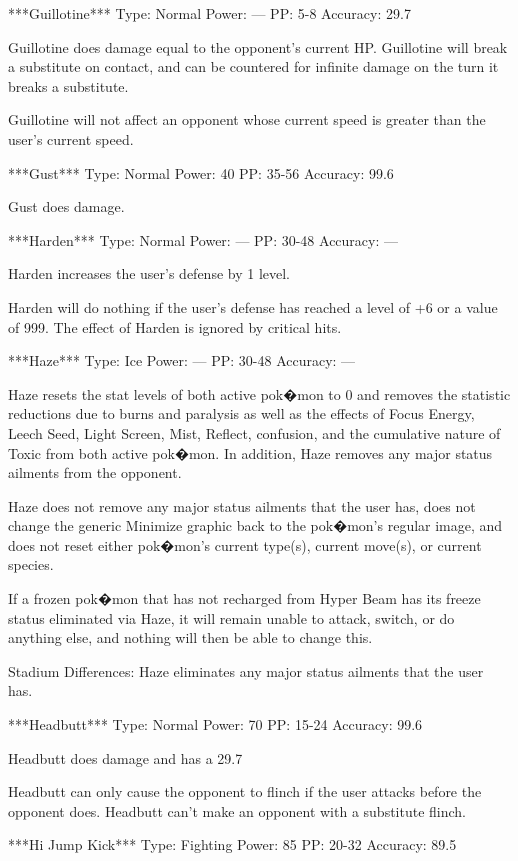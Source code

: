 \documentclass[reprint, aps, prl, paper=A4]{revtex4-1}
\begin{document}
***Guillotine***
Type: Normal
Power: ---
PP: 5-8
Accuracy: 29.7%

Guillotine does damage equal to the opponent's current HP. Guillotine will break a substitute
on contact, and can be countered for infinite damage on the turn it breaks a substitute.

Guillotine will not affect an opponent whose current speed is greater than the user's current
speed.


***Gust***
Type: Normal
Power: 40
PP: 35-56
Accuracy: 99.6%

Gust does damage.


***Harden***
Type: Normal
Power: ---
PP: 30-48
Accuracy: ---

Harden increases the user's defense by 1 level.

Harden will do nothing if the user's defense has reached a level of +6 or a value of 999. The
effect of Harden is ignored by critical hits.


***Haze***
Type: Ice
Power: ---
PP: 30-48
Accuracy: ---

Haze resets the stat levels of both active pok�mon to 0 and removes the statistic reductions
due to burns and paralysis as well as the effects of Focus Energy, Leech Seed, Light Screen,
Mist, Reflect, confusion, and the cumulative nature of Toxic from both active pok�mon. In
addition, Haze removes any major status ailments from the opponent.

Haze does not remove any major status ailments that the user has, does not change the generic
Minimize graphic back to the pok�mon's regular image, and does not reset either pok�mon's
current type(s), current move(s), or current species.

If a frozen pok�mon that has not recharged from Hyper Beam has its freeze status eliminated via
Haze, it will remain unable to attack, switch, or do anything else, and nothing will then be
able to change this.

Stadium Differences:
Haze eliminates any major status ailments that the user has.


***Headbutt***
Type: Normal
Power: 70
PP: 15-24
Accuracy: 99.6%

Headbutt does damage and has a 29.7%

Headbutt can only cause the opponent to flinch if the user attacks before the opponent does.
Headbutt can't make an opponent with a substitute flinch.


***Hi Jump Kick***
Type: Fighting
Power: 85
PP: 20-32
Accuracy: 89.5%
\end{document}
